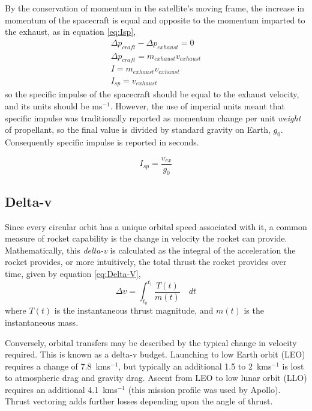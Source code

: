 By the conservation of momentum in the satellite's moving frame, the increase in momentum of the spacecraft is equal and opposite to the momentum imparted to the exhaust, as in equation \eqref{eq:Isp},
\begin{subequations}\label{eq:Isp}
\begin{gather}
\Delta p_{craft} - \Delta p_{exhaust} = 0 \\
\Delta p_{craft} = m_{exhaust}v_{exhaust} \\
I = m_{exhaust}v_{exhaust} \\
I_{sp} = v_{exhaust}
\end{gather}
\end{subequations}
so the specific impulse of the spacecraft should be equal to the exhaust velocity, and its units should be ms$^{-1}$. However, the use of imperial units meant that specific impulse was traditionally reported as momentum change per unit {\em weight} of propellant, so the final value is divided by standard gravity on Earth, $g_0$. Consequently specific impulse is reported in seconds.

\begin{equation}
I_{sp}=\frac{v_{ex}}{g_0}
\end{equation}

\subsection{Delta-v} \label{sub:Delta-v}

Since every circular orbit has a unique orbital speed associated with it, a common measure of rocket capability is the change in velocity the rocket can provide. Mathematically, this \emph{delta-v} is calculated as the integral of the acceleration the rocket provides, or more intuitively, the total thrust the rocket provides over time, given by equation \eqref{eq:Delta-V},
\begin{equation}\label{eq:Delta-V}
\Delta v=\int_{t_{0}}^{t_{1}}\frac{T(t)}{m(t)}\quad dt
\end{equation}
where $T(t)$ is the instantaneous thrust magnitude, and $m(t)$ is the instantaneous mass.

Conversely, orbital transfers may be described by the typical change in velocity required. This is known as a delta-v budget. Launching to low Earth orbit (LEO) requires a change of 7.8~kms$^{-1}$, but typically an additional 1.5 to 2~kms$^{-1}$ is lost to atmospheric drag and gravity drag. Ascent from LEO to low lunar orbit (LLO) requires an additional 4.1~kms$^{-1}$ (this mission profile was used by Apollo). Thrust vectoring adds further losses depending upon the angle of thrust. 


